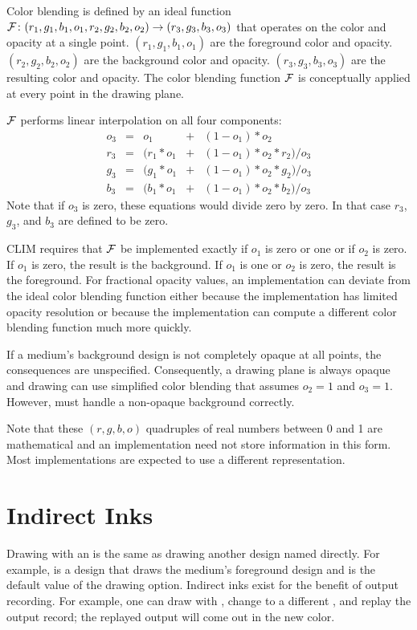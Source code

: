 Color blending is defined by an ideal function
${\cal F}\colon (r_1,g_1,b_1,o_1,r_2,g_2,b_2,o_2)\rightarrow (r_3,g_3,b_3,o_3)$
that operates on the color and opacity at a single point.
$(r_1,g_1,b_1,o_1)$ are the foreground color and opacity.
$(r_2,g_2,b_2,o_2)$ are the background color and opacity.
$(r_3,g_3,b_3,o_3)$ are the resulting color and opacity.  The color
blending function ${\cal F}$ is conceptually applied at every point in the
drawing plane.

${\cal F}$ performs linear interpolation on all four components:
\[ \begin{array}{rcrcl}
o_3 & = &        o_1 & + & (1 - o_1) * o_2 \\
r_3 & = & (r_1 * o_1 & + & (1 - o_1) * o_2 * r_2) / o_3 \\
g_3 & = & (g_1 * o_1 & + & (1 - o_1) * o_2 * g_2) / o_3 \\
b_3 & = & (b_1 * o_1 & + & (1 - o_1) * o_2 * b_2) / o_3
\end{array} \]
Note that if $o_3$ is zero, these equations would divide zero by zero.
In that case $r_3$, $g_3$, and $b_3$ are defined to be zero.

CLIM requires that ${\cal F}$ be implemented exactly if $o_1$ is zero or one or
if $o_2$ is zero.  If $o_1$ is zero, the result is the background.  If $o_1$ is
one or $o_2$ is zero, the result is the foreground.  For fractional opacity
values, an implementation can deviate from the ideal color blending function
either because the implementation has limited opacity resolution or because the
implementation can compute a different color blending function much more
quickly.

If a medium's background design is not completely opaque at all points, the
consequences are unspecified.  Consequently, a drawing plane is always opaque
and drawing can use simplified color blending that assumes $o_2 = 1$ and
$o_3 = 1$.  However,  must handle a non-opaque background
correctly. 

Note that these $(r,g,b,o)$ quadruples of real numbers between 0 and 1 are
mathematical and an implementation need not store information in this form.
Most implementations are expected to use a different representation.


\section {Indirect Inks}

Drawing with an  is the same as drawing another design
named directly.  For example,  is a design that draws the
medium's foreground design and is the default value of the  drawing
option.  Indirect inks exist for the benefit of output recording.  For example,
one can draw with , change to a different
, and replay the output record; the replayed output will
come out in the new color.


